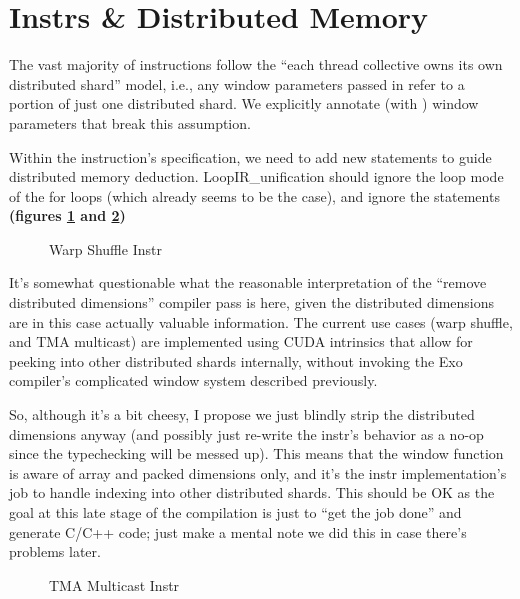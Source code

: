 \newpage
\section{Instrs \& Distributed Memory}
\label{ch:Instrs}

The vast majority of instructions follow the ``each thread collective owns its own distributed shard'' model, i.e., any window parameters passed in refer to a portion of just one distributed shard.
We explicitly annotate (with ) window parameters that break this assumption.

\filbreak
Within the instruction's  specification, we need to add new  statements to guide distributed memory deduction.
LoopIR\_unification should ignore the loop mode of the for loops (which already seems to be the case), and ignore the  statements \textbf{(figures \ref{fig:shfl} and \ref{fig:tma})}

\begin{figure}[!b]

\caption{Warp Shuffle Instr} \label{fig:shfl}
\end{figure}

\filbreak
It's somewhat questionable what the reasonable interpretation of the ``remove distributed dimensions'' compiler pass is here, given the distributed dimensions are in this case actually valuable information.
The current use cases (warp shuffle, and TMA multicast) are implemented using CUDA intrinsics that allow for peeking into other distributed shards internally, without invoking the Exo compiler's complicated window system described previously.

\filbreak
So, although it's a bit cheesy, I propose we just blindly strip the distributed dimensions anyway (and possibly just re-write the instr's behavior as a no-op since the typechecking will be messed up).
This means that the window  function is aware of array and packed dimensions only, and it's the instr implementation's job to handle indexing into other distributed shards.
This should be OK as the goal at this late stage of the compilation is just to ``get the job done'' and generate C/C++ code;
just make a mental note we did this in case there's problems later.

\begin{figure}[!b]

\caption{TMA Multicast Instr} \label{fig:tma}
\end{figure}

